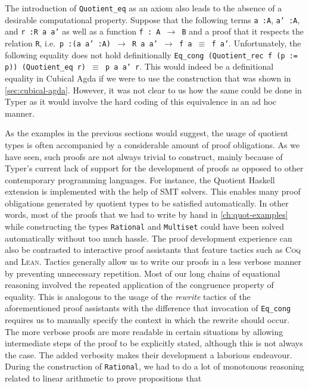 \documentclass[12pt,twoside,maitrise]{dms}
\theoremstyle{definition}
\numberwithin{equation}{section}
\numberwithin{table}{chapter}
\numberwithin{figure}{chapter}
\newcommand\id[1] {\texttt{#1}}
\newcommand\fn[1] {\texttt{#1}}
\def\Coq{\textsc{Coq}\xspace}
\def\Lean{\textsc{Lean}\xspace}
\begin{document}
The introduction of \id{Quotient\_eq} as an axiom also leads to the absence of a
desirable computational property. Suppose that the following terms \fn{a :\@ A},
\fn{a' :\@ A}, and \fn{r :\@ R a a'} as well as a function \fn{f : A $\rightarrow$
  B} and a proof that it respects the relation \id{R}, i.e.\ \fn{p :\@ (a a' :\@ A)
  $\rightarrow$ R a a' $\rightarrow$ f a $\equiv$ f a'}. Unfortunately, the
following equality does not hold definitionally \fn{Eq\_cong (Quotient\_rec f (p
  := p)) (Quotient\_eq r) $\equiv$ p a a' r}. This would indeed be a
definitional equality in Cubical Agda if we were to use the construction that
was shown in \autoref{sec:cubical-agda}. However, it was not clear to us how the
same could be done in Typer as it would involve the hard coding of this
equivalence in an ad hoc manner.

As the examples in the previous sections would suggest, the usage of quotient
types is often accompanied by a considerable amount of proof obligations. As we
have seen, such proofs are not always trivial to construct, mainly because of
Typer's current lack of support for the development of proofs as opposed to
other contemporary programming languages. For instance, the Quotient Haskell
extension\cite{hewer2023quotient} is implemented with the help of SMT solvers. This enables many proof obligations generated by
quotient types to be satisfied automatically. In other words, most of the proofs
that we had to write by hand in \autoref{ch:quot-examples} while constructing
the types \id{Rational} and \id{Multiset} could have been solved automatically
without too much hassle. The proof development experience can also be contrasted
to interactive proof assistants that feature tactics such as \Coq{} and \Lean{}.
Tactics generally allow us to write our proofs in a less verbose manner by
preventing unnecessary repetition. Most of our long chains of equational
reasoning involved the repeated application of the congruence property of
equality. This is analogous to the usage of the \emph{rewrite} tactics of the
aforementioned proof assistants with the difference that invocation of
\id{Eq\_cong} requires us to manually specify the context in which the rewrite
should occur. The more verbose proofs are more readable in certain situations by
allowing intermediate steps of the proof to be explicitly stated, although this
is not always the case. The added verbosity makes their development a laborious
endeavour. During the construction of \id{Rational}, we had to do a lot of
monotonous reasoning related to linear arithmetic to prove propositions that
\end{document}
